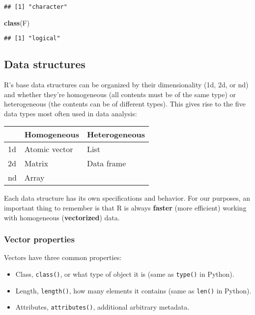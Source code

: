 \documentclass[
]{book}
\newenvironment{Shaded}{\begin{snugshade}}{\end{snugshade}}
\newcommand{\KeywordTok}[1]{\textcolor[rgb]{0.13,0.29,0.53}{\textbf{#1}}}
\newcommand{\NormalTok}[1]{#1}
\providecommand{\tightlist}{%
  \setlength{\itemsep}{0pt}\setlength{\parskip}{0pt}}
\begin{document}
\begin{verbatim}
## [1] "character"
\end{verbatim}

\begin{Shaded}
\begin{Highlighting}[]
\KeywordTok{class}\NormalTok{(F)}
\end{Highlighting}
\end{Shaded}

\begin{verbatim}
## [1] "logical"
\end{verbatim}

\hypertarget{data-structures}{%
\subsection{Data structures}\label{data-structures}}

R's base data structures can be organized by their dimensionality (1d, 2d, or nd) and whether they're homogeneous (all contents must be of the same type) or heterogeneous (the contents can be of different types). This gives rise to the five data types most often used in data analysis:

\begin{longtable}[]{@{}lll@{}}
\toprule
& Homogeneous & Heterogeneous\tabularnewline
\midrule
\endhead
1d & Atomic vector & List\tabularnewline
2d & Matrix & Data frame\tabularnewline
nd & Array &\tabularnewline
\bottomrule
\end{longtable}

Each data structure has its own specifications and behavior. For our purposes, an important thing to remember is that R is always \textbf{faster} (more efficient) working with homogeneous (\textbf{vectorized}) data.

\hypertarget{vector-properties}{%
\subsubsection{Vector properties}\label{vector-properties}}

Vectors have three common properties:

\begin{itemize}
\tightlist
\item
  Class, \texttt{class()}, or what type of object it is (same as \texttt{type()} in Python).
\item
  Length, \texttt{length()}, how many elements it contains (same as \texttt{len()} in Python).
\item
  Attributes, \texttt{attributes()}, additional arbitrary metadata.
\end{itemize}
\end{document}

